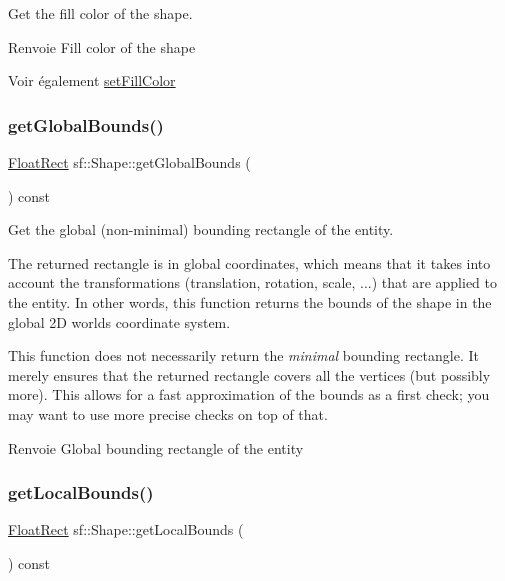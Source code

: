 Get the fill color of the shape. 

\begin{DoxyReturn}{Renvoie}
Fill color of the shape
\end{DoxyReturn}
\begin{DoxySeeAlso}{Voir également}
\hyperlink{classsf_1_1Shape_a3506f9b5d916fec14d583d16f23c2485}{set\+Fill\+Color} 
\end{DoxySeeAlso}
\mbox{\label{classsf_1_1Shape_ac0e29425d908d5442060cc44790fe4da}} 
\subsubsection{\texorpdfstring{get\+Global\+Bounds()}{getGlobalBounds()}}
{\footnotesize\ttfamily \hyperlink{classsf_1_1Rect}{Float\+Rect} sf\+::\+Shape\+::get\+Global\+Bounds (\begin{DoxyParamCaption}{ }\end{DoxyParamCaption}) const}



Get the global (non-\/minimal) bounding rectangle of the entity. 

The returned rectangle is in global coordinates, which means that it takes into account the transformations (translation, rotation, scale, ...) that are applied to the entity. In other words, this function returns the bounds of the shape in the global 2D world\textquotesingle{}s coordinate system.

This function does not necessarily return the {\itshape minimal} bounding rectangle. It merely ensures that the returned rectangle covers all the vertices (but possibly more). This allows for a fast approximation of the bounds as a first check; you may want to use more precise checks on top of that.

\begin{DoxyReturn}{Renvoie}
Global bounding rectangle of the entity 
\end{DoxyReturn}
\mbox{\label{classsf_1_1Shape_ae3294bcdf8713d33a862242ecf706443}} 
\subsubsection{\texorpdfstring{get\+Local\+Bounds()}{getLocalBounds()}}
{\footnotesize\ttfamily \hyperlink{classsf_1_1Rect}{Float\+Rect} sf\+::\+Shape\+::get\+Local\+Bounds (\begin{DoxyParamCaption}{ }\end{DoxyParamCaption}) const}



